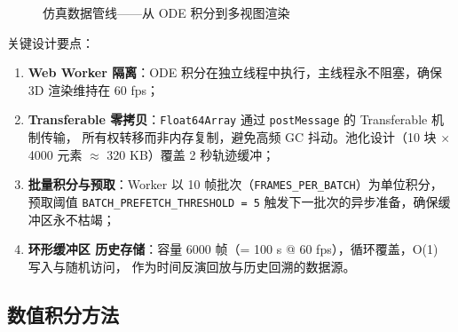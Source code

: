 \begin{figure}[htbp]
  \centering
  \caption{仿真数据管线——从 ODE 积分到多视图渲染}
  \label{fig:pipeline}
\end{figure}

关键设计要点：

\begin{enumerate}[label=(\arabic*), leftmargin=*]
  \item \textbf{Web Worker 隔离}：ODE 积分在独立线程中执行，主线程永不阻塞，确保 3D 渲染维持在 60 fps；
  \item \textbf{Transferable 零拷贝}：\texttt{Float64Array} 通过 \texttt{postMessage} 的 Transferable 机制传输，
       所有权转移而非内存复制，避免高频 GC 抖动。池化设计（10 块 $\times$ 4000 元素 $\approx$ 320 KB）覆盖 2 秒轨迹缓冲；
  \item \textbf{批量积分与预取}：Worker 以 10 帧批次（\texttt{FRAMES\_PER\_BATCH}）为单位积分，
       预取阈值 \texttt{BATCH\_PREFETCH\_THRESHOLD = 5} 触发下一批次的异步准备，确保缓冲区永不枯竭；
  \item \textbf{环形缓冲区 历史存储}：容量 6000 帧（= 100 s @ 60 fps），循环覆盖，O(1) 写入与随机访问，
       作为时间反演回放与历史回溯的数据源。
\end{enumerate}

\subsection{数值积分方法}

